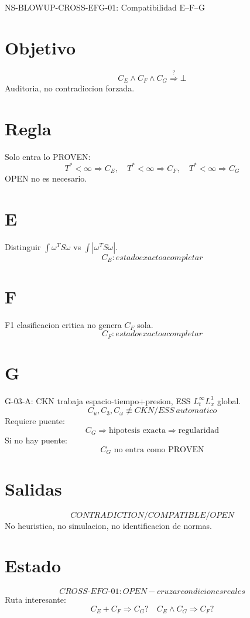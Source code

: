\documentclass{article}
\begin{document}
\begin{center}
{\Large NS-BLOWUP-CROSS-EFG-01: Compatibilidad E--F--G}
\end{center}
\section*{Objetivo}
\[
\boxed{C_E\land C_F\land C_G\stackrel{?}{\Rightarrow}\bot}
\]
Auditoria, no contradiccion forzada.

\section*{Regla}
Solo entra lo PROVEN:
\[
T^*<\infty\Rightarrow C_E,\quad T^*<\infty\Rightarrow C_F,\quad T^*<\infty\Rightarrow C_G
\]
OPEN no es necesario.

\section*{E}
Distinguir $\int\omega^T S\omega$ vs $\int|\omega^T S\omega|$.
\[
\boxed{C_E: estado exacto a completar}
\]

\section*{F}
F1 clasificacion critica no genera $C_F$ sola.
\[
\boxed{C_F: estado exacto a completar}
\]

\section*{G}
G-03-A: CKN trabaja espacio-tiempo+presion, ESS $L^\infty_tL^3_x$ global.
\[
C_u,C_3,C_\omega\not\equiv CKN/ESS\ automatico
\]
Requiere puente:
\[
C_G\Rightarrow\text{hipotesis exacta}\Rightarrow\text{regularidad}
\]
Si no hay puente:
\[
\boxed{C_G\text{ no entra como PROVEN}}
\]

\section*{Salidas}
\[
\boxed{CONTRADICTION / COMPATIBLE / OPEN}
\]
No heuristica, no simulacion, no identificacion de normas.

\section*{Estado}
\[
\boxed{CROSS\text{-}EFG\text{-}01: OPEN - cruzar condiciones reales}
\]
Ruta interesante:
\[
\boxed{C_E+C_F\Rightarrow C_G?\quad C_E\land C_G\Rightarrow C_F?}
\]
\end{document}
